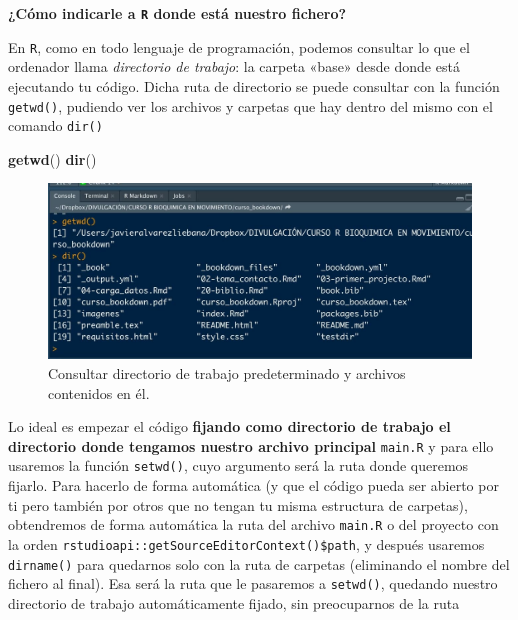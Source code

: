 \documentclass[11pt,]{book}
\newenvironment{Shaded}{\begin{snugshade}}{\end{snugshade}}
\newcommand{\CommentTok}[1]{\textcolor[rgb]{0.37,0.37,0.37}{\textit{#1}}}
\newcommand{\KeywordTok}[1]{\textcolor[rgb]{0.27,0.27,0.27}{\textbf{#1}}}
\newcommand{\NormalTok}[1]{#1}
\newcommand{\OperatorTok}[1]{\textcolor[rgb]{0.43,0.43,0.43}{\textbf{#1}}}
\begin{document}
\textbf{¿Cómo indicarle a \texttt{R} donde está nuestro fichero?}

En \texttt{R}, como en todo lenguaje de programación, podemos consultar lo que el ordenador llama \emph{directorio de trabajo}: la carpeta «base» desde donde está ejecutando tu código. Dicha ruta de directorio se puede consultar con la función \texttt{getwd()}, pudiendo ver los archivos y carpetas que hay dentro del mismo con el comando \texttt{dir()}

\begin{Shaded}
\begin{Highlighting}[]
\KeywordTok{getwd}\NormalTok{()}
\KeywordTok{dir}\NormalTok{()}
\end{Highlighting}
\end{Shaded}

\begin{figure}

{\centering \includegraphics[width=0.5\linewidth]{./img/getwd} 

}

\caption{Consultar directorio de trabajo predeterminado y archivos contenidos en él.}\label{fig:getwd}
\end{figure}

Lo ideal es empezar el código \textbf{fijando como directorio de trabajo el directorio donde tengamos nuestro archivo principal} \texttt{main.R} y para ello usaremos la función \texttt{setwd()}, cuyo argumento será la ruta donde queremos fijarlo. Para hacerlo de forma automática (y que el código pueda ser abierto por ti pero también por otros que no tengan tu misma estructura de carpetas), obtendremos de forma automática la ruta del archivo \texttt{main.R} o del proyecto con la orden \texttt{rstudioapi::getSourceEditorContext()\$path}, y después usaremos \texttt{dirname()} para quedarnos solo con la ruta de carpetas (eliminando el nombre del fichero al final). Esa será la ruta que le pasaremos a \texttt{setwd()}, quedando nuestro directorio de trabajo automáticamente fijado, sin preocuparnos de la ruta

\begin{Shaded}
\end{Shaded}
\end{document}
